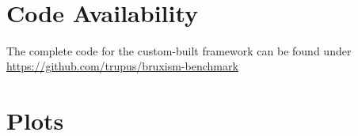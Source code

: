 \documentclass{wissdoc}
\begin{document}
\frontmatter
{}
\ifnotdraft{
 
}


\cleardoublepage
{\pagestyle{empty}
~
\cleardoublepage}


\graphicspath{{src/}}

\mainmatter
{}










% 
\chapter{Code Availability}
The complete code for the custom-built framework can be found under \url{https://github.com/trupus/bruxism-benchmark}


\appendix
\chapter{Plots}

%


\cleardoublepage
{}
{}
\printbibliography
\end{document}
